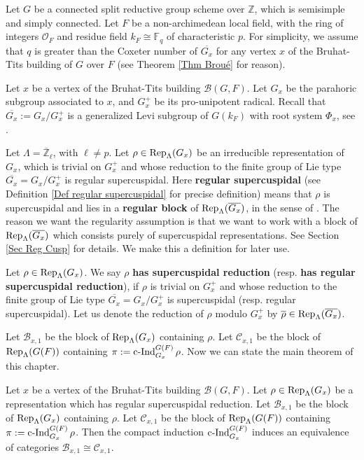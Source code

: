 		Let $G$ be a connected split reductive group scheme over $\mathbb{Z}$, which is semisimple and simply connected. Let $F$ be a non-archimedean local field, with the ring of integers $\mathcal{O}_F$ and residue field $k_F \cong \mathbb{F}_q$ of characteristic $p$. For simplicity, we assume that $q$ is greater than the Coxeter number of $\overline{G_x}$ for any vertex $x$ of the Bruhat-Tits building of $G$ over $F$ (see Theorem \ref{Thm Broué} for reason).
		
		Let $x$ be a vertex of the Bruhat-Tits building $\mathcal{B}(G, F)$. Let $G_x$ be the parahoric subgroup associated to $x$, and $G_x^+$ be its pro-unipotent radical. Recall that $\overline{G_x}:=G_x/G_x^+$ is a generalized Levi subgroup of $G(k_F)$ with root system $\Phi_x$, see \cite[Theorem 3.17]{rabinoff2003bruhat}. 
		
		Let $\Lambda=\overline{\mathbb{Z}}_{\ell}$, with $\ell \neq p$. Let $\rho \in \operatorname{\operatorname{Rep}}_{\Lambda}(G_x)$ be an irreducible representation of $G_x$, which is trivial on $G_x^+$ and whose reduction to the finite group of Lie type $\overline{G_x}=G_x/G_x^+$ is  
		regular supercuspidal. Here \textbf{regular supercuspidal} (see Definition \ref{Def regular supercuspidal} for precise definition) means that $\rho$ is supercuspidal and lies in a \textbf{regular block} of $\operatorname{\operatorname{Rep}}_{\Lambda}(\overline{G_x})$, in the sense of \cite{broue1990isometries}. The reason we want the regularity assumption is that we want to work with a block of $\operatorname{\operatorname{Rep}}_{\Lambda}(\overline{G_x})$ which consists purely of supercuspidal representations. See Section \ref{Sec Reg Cusp} for details. We make this a definition for later use.
		
		\begin{definition}
			Let $\rho \in \operatorname{\operatorname{Rep}}_{\Lambda}(G_x)$. We say $\rho$ \textbf{has supercuspidal reduction} (resp. \textbf{has regular supercuspidal reduction}), if $\rho$ is trivial on $G_x^+$ and whose reduction to the finite group of Lie type $\overline{G_x}=G_x/G_x^+$ is supercuspidal (resp. regular supercuspidal). Let us denote the reduction of $\rho$ modulo $G_x^+$ by $\overline{\rho} \in \operatorname{\operatorname{Rep}}_{\Lambda}(\overline{G_x})$.
		\end{definition}
		
		Let $\mathcal{B}_{x,1}$ be the block of $\operatorname{\operatorname{Rep}}_{\Lambda}(G_x)$ containing $\rho$. Let $\mathcal{C}_{x,1}$ be the block of $\operatorname{\operatorname{Rep}}_{\Lambda}(G(F))$ containing $\pi:=\operatorname{\operatorname{c-Ind}}_{G_x}^{G(F)}\rho$. Now we can state the main theorem of this chapter.
		
		\begin{theorem}\label{Thm Main}
			Let $x$ be a vertex of the Bruhat-Tits building $\mathcal{B}(G, F)$. Let $\rho \in \operatorname{\operatorname{Rep}}_{\Lambda}(G_x)$ be a representation which has regular supercuspidal reduction. Let $\mathcal{B}_{x,1}$ be the block of $\operatorname{\operatorname{Rep}}_{\Lambda}(G_x)$ containing $\rho$. Let $\mathcal{C}_{x,1}$ be the block of $\operatorname{\operatorname{Rep}}_{\Lambda}(G(F))$ containing $\pi:=\operatorname{\operatorname{c-Ind}}_{G_x}^{G(F)}\rho$. Then the compact induction $\operatorname{\operatorname{c-Ind}}_{G_x}^{G(F)}$ induces an equivalence of categories $\mathcal{B}_{x,1} \cong \mathcal{C}_{x,1}$. 
		\end{theorem}
		

